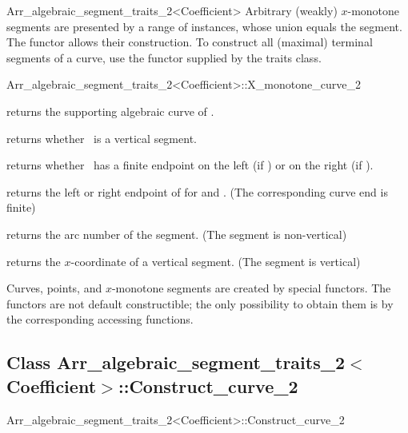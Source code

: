 \begin{ccRefClass}{Arr_algebraic_segment_traits_2<Coefficient>}
Arbitrary (weakly) $x$-monotone segments are presented by a range 
of  instances, whose union equals the segment.
The functor  allows their construction.
To construct all (maximal) terminal segments of a curve,
use the  functor supplied by the traits class.

\begin{ccClass}{Arr_algebraic_segment_traits_2<Coefficient>::X_monotone_curve_2}


  {returns the supporting algebraic curve of \ccVar.}

  {returns whether \ccVar\ is a vertical segment.}

  {returns whether \ccVar\ has a finite endpoint on the left 
    (if ) or on the right 
    (if ).}

  {returns the left or right endpoint of \ccVar for 
   and .
   \ccPrecond(The corresponding curve end is finite)}

  {returns the arc number of the segment.
   \ccPrecond(The segment is non-vertical)}

  {returns the $x$-coordinate of a vertical segment.
   \ccPrecond(The segment is vertical)}

\end{ccClass}


Curves, points, and $x$-monotone segments are created by special functors. 
The functors are not default constructible; the only possibility to
obtain them is by the corresponding accessing functions.

\subsection*{Class 
Arr\_algebraic\_segment\_traits\_2$<$Coefficient$>$::Construct\_curve\_2}

\begin{ccClass}{Arr_algebraic_segment_traits_2<Coefficient>::Construct_curve_2}


\end{ccClass}
\end{ccRefClass}
